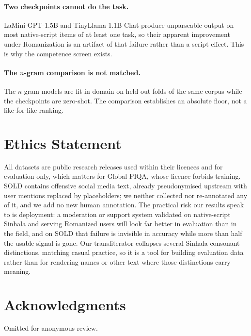 \documentclass[11pt]{article}
\begin{document}
\paragraph{Two checkpoints cannot do the task.} LaMini-GPT-1.5B and
TinyLlama-1.1B-Chat produce unparseable output on most native-script items of at least
one task, so their apparent improvement under Romanization is an artifact of that
failure rather than a script effect. This is why the competence screen exists.

\paragraph{The $n$-gram comparison is not matched.} The $n$-gram models are fit
in-domain on held-out folds of the same corpus while the checkpoints are zero-shot.
The comparison establishes an absolute floor, not a like-for-like ranking.

\section*{Ethics Statement}

All datasets are public research releases used within their licences and for
evaluation only, which matters for Global PIQA, whose licence forbids training. SOLD
contains offensive social media text, already pseudonymised upstream with user
mentions replaced by placeholders; we neither collected nor re-annotated any of it,
and we add no new human annotation. The practical risk our results speak to is
deployment: a moderation or support system validated on native-script Sinhala and
serving Romanized users will look far better in evaluation than in the field, and on
SOLD that failure is invisible in accuracy while more than half the usable signal is
gone. Our transliterator collapses several Sinhala consonant distinctions, matching
casual practice, so it is a tool for building evaluation data rather than for
rendering names or other text where those distinctions carry meaning.

\section*{Acknowledgments}

Omitted for anonymous review.



\appendix
\end{document}
